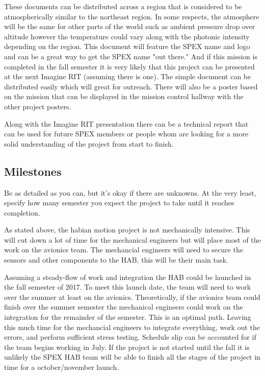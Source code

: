 \documentclass[journal]{SPEXformat}
\newenvironment{help}{
  \ttfamily\footnotesize\sloppy
  \begin{lrbox}{\helpbox}\begin{minipage}{\linewidth}
  }{
  \end{minipage}\end{lrbox}
  \ifbool{showhelp}{
    \fbox{\usebox{\helpbox}}
  }{}
}
\begin{document}
  These documents can be distributed across a region that is considered to be atmospherically similar to the northeast region. In some respects,
  the atmosphere will be the same for other parts of the world such as ambient pressure drop over altitude however the temperature could vary
  along with the photonic intensity depending on the region. This document will feature the SPEX name and logo and can be a great way to
  get the SPEX name "out there." And if this mission is completed in the fall semester it is very likely that this project can be presented
  at the next Imagine RIT (assuming there is one). The simple document can be distributed easily which will great for outreach. There
  will also be a poster based on the mission that can be displayed in the mission control hallway with the other project posters.

  Along with the Imagine RIT presentation there can be a technical report that can be used for future SPEX members or people whom are
  looking for a more solid understanding of the project from start to finish.

\subsection{Milestones}
\label{subsec:milestones}
\begin{help}
  Be as detailed as you can, but it's okay if there are unknowns.
  At the very least, specify how many semester you expect the project to take until it reaches completion.
\end{help}
  As stated above, the habian motion project is not mechanically intensive. This will cut down a lot of time for the mechanical engineers
  but will place most of the work on the avionics team. The mechancial engineers will need to secure the sensors and other components to
  the HAB, this will be their main task.

  Assuming a steady-flow of work and integration the HAB could be launched in the fall semester of 2017. To meet this launch date,
  the team will need to work over the summer at least on the avionics. Theoretically, if the avionics team could finish over the summer semester
  the mechanical engineers could work on the integration for the remainder of the semester. This is an optimal path. Leaving this much time
  for the mechancial engineers to integrate everything, work out the errors, and perform sufficient stress testing.
  Schedule slip can be accounted for if the team begins working in July. If the project is not started until the fall it is unlikely the SPEX HAB
  team will be able to finish all the stages of the project in time for a october/november launch.
\end{document}
